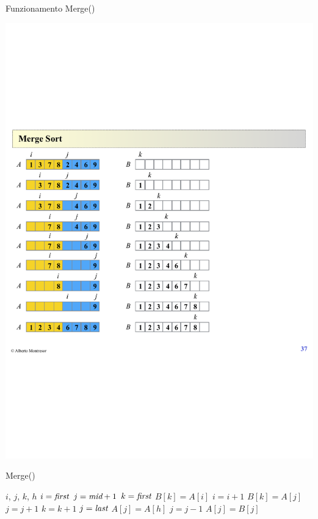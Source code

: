 \begin{frame}{Funzionamento \textsf{Merge}()}

\begin{center}
\includegraphics[width=\textwidth]{merge3.pdf}
\end{center}

\end{frame}

\begin{frame}[shrink=6]{\textsf{Merge}()}
	
\vspace{-12pt}
\begin{Procedure}
\caption[A]{\Merge($\Item\ A[\,]$, \INTEGER\ \Primo, \INTEGER\ \Ultimo, \INTEGER \Mezzo)}
\begin{multicols}{2}
  \INTEGER $i$, $j$, $k$, $h$\;
  $i = \textit{first}$\;
	$j = \textit{mid}+1$\;
	$k = \textit{first}$\;
  {
    {
      $B[k] = A[i]$\;
      $i = i+1$\;
    }
    {
      $B[k] = A[j]$\;
      $j = j+1$\;
    }
    $k = k+1$\;
  }
  $j = \textit{last}$\;
  {
    $A[j] = A[h]$\;
    $j = j-1$\;
  }
  {
    $A[j] = B[j]$\;
  }
\end{multicols}
\BlankLine
\BlankLine
\end{Procedure}

\end{frame}

